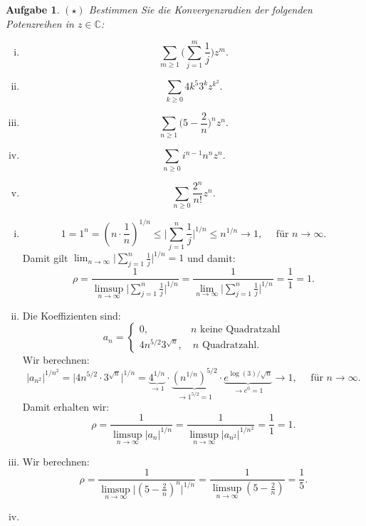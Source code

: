 \documentclass[a4paper, 20]{exam}
\newtheorem{ex}{Aufgabe}
\newcommand\CC{\mathbb{C}}
\begin{document}
\begin{ex}{$(\star)$}
Bestimmen Sie die Konvergenzradien der folgenden Potenzreihen in $z\in \CC$:
\begin{enumerate}[i.)]
\item
$$ \sum_{m\geq 1} \bigg( \sum_{j=1}^m \frac{1}{j} \bigg) z^m.$$
\item
$$ \sum_{k\geq 0} 4k^5 3^k z^{k^2}.$$
\item
$$ \sum_{n\geq 1} \bigg(5- \frac{2}{n} \bigg)^n z^n.$$
\item
$$ \sum_{n\geq 0} i^{n-1}n^n z^n. $$
\item
$$ \sum_{n\geq 0} \frac{2^n}{n!} z^n. $$
\end{enumerate}
\end{ex}
\begin{solution}
\begin{enumerate}[i.)]
\item
$$ 1 = 1^n = \left( n \cdot \frac{1}{n}\right)^{1/n} 
\leq \bigg\vert \sum_{j=1}^{n} \frac{1}{j} \bigg\vert^{1/n}
\leq n^{1/n} \longrightarrow 1, \quad \text{ f\"ur } n \longrightarrow \infty.$$
Damit gilt 
$\lim_{n \rightarrow \infty} \bigg\vert \sum_{j=1}^{n} \frac{1}{j} \bigg\vert^{1/n} =1$ 
und damit:
$$ \rho 
= \frac{1}{\limsup_{n\rightarrow \infty} \bigg\vert \sum_{j=1}^{n} \frac{1}{j} \bigg\vert^{1/n} } 
= \frac{1}{\lim_{n\rightarrow \infty} \bigg\vert \sum_{j=1}^{n} \frac{1}{j} \bigg\vert^{1/n} }
= \frac{1}{1}=1.$$
\item
Die Koeffizienten sind:
$$ a_n = \begin{cases} 0, \qquad \qquad \ n \text{ keine Quadratzahl} \\ 4n^{5/2} 3^{\sqrt{n}}, \quad n \text{ Quadratzahl.}   \end{cases} $$
Wir berechnen:
$$ \vert a_{n^2} \vert^{1/n^2} =\vert 4n^{5/2}\cdot 3^{\sqrt{n}} \vert^{1/n}
= \underbrace{4^{1/n}}_{\longrightarrow 1} \cdot \underbrace{\left( n^{1/n} \right)^{5/2}}_{\longrightarrow 1^{5/2}=1} \cdot \underbrace{e^{\log(3)/\sqrt{n}}}_{\longrightarrow e^0=1} \longrightarrow 1, \quad \text{ f\"ur } n \longrightarrow \infty.$$
Damit erhalten wir:
$$ \rho = \frac{1}{\limsup_{n \rightarrow \infty} \vert a_n \vert^{1/n}} 
= \frac{1}{\limsup_{n \rightarrow \infty} \vert a_{n^2} \vert^{1/n^2}} 
= \frac{1}{1}= 1.$$
\item
Wir berechnen:
$$ \rho 
= \frac{1}{\limsup_{n \rightarrow \infty} \bigg\vert \left( 5 - \frac{2}{n}\right)^n \bigg\vert^{1/n}}
= \frac{1}{\limsup_{n \rightarrow \infty} \left( 5 - \frac{2}{n}\right)}
= \frac{1}{5}.$$
\item

\end{enumerate}
\end{solution}
\end{document}
